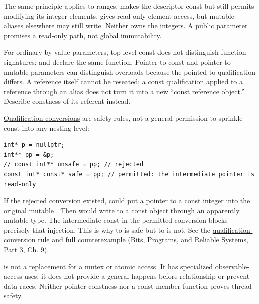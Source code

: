 The same principle applies to ranges.  makes the descriptor const but still permits modifying its integer elements.  gives read-only element access, but mutable aliases elsewhere may still write. Neither owns the integers. A public  parameter promises a read-only path, not global immutability.

For ordinary by-value parameters, top-level const does not distinguish function signatures:  and  declare the same function. Pointer-to-const and pointer-to-mutable parameters can distinguish overloads because the pointed-to qualification differs. A reference itself cannot be reseated; a const qualification applied to a reference through an alias does not turn it into a new ``const reference object.'' Describe constness of its referent instead.

\hyperref[appendix-5e1a7561cd98]{Qualification conversions} are safety rules, not a general permission to sprinkle const into any nesting level:

\begin{verbatim}
int* p = nullptr;
int** pp = &p;
// const int** unsafe = pp; // rejected
const int* const* safe = pp; // permitted: the intermediate pointer is read-only
\end{verbatim}

If the rejected conversion existed,  could put a pointer to a const integer into the original mutable . Then  would write to a const object through an apparently mutable type. The intermediate const in the permitted conversion blocks precisely that injection. This is why  to  is safe but  to  is not. See the \href{https://eel.is/c++draft/conv.qual}{qualification-conversion rule} and \href{../01-Bits-Programs-and-Reliable-Systems-P03/main.pdf\#nameddest=01-foundations-i-ch011-c---qualification-safety-and-borrow-intervals}{full counterexample (Bits, Programs, and Reliable Systems, Part 3, Ch. 9)}.

 is not a replacement for a mutex or atomic access. It has specialized observable-access uses; it does not provide a general happens-before relationship or prevent data races. Neither pointer constness nor a const member function proves thread safety.

